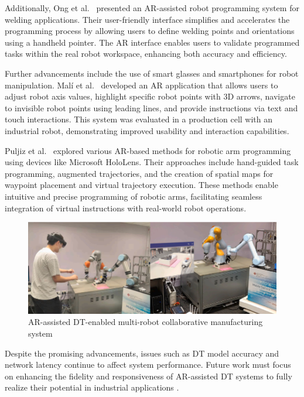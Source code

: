\begin{enumerate}
    Additionally, Ong et al.~\cite{ong2020} presented an AR-assisted robot programming system for welding applications. Their user-friendly interface 
    simplifies and accelerates the programming process by allowing users to define welding points and orientations using a handheld pointer. 
    The \ac{AR} interface enables users to validate programmed tasks within the real robot workspace, enhancing both accuracy and efficiency.
    
    Further advancements include the use of smart glasses and smartphones for robot manipulation. Malí et al.~\cite{7819154} developed an \ac{AR} 
    application that allows users to adjust robot axis values, highlight specific robot points with 3D arrows, navigate to invisible robot points using
    leading lines, and provide instructions via text and touch interactions. This system was evaluated in a production cell with an industrial robot, 
    demonstrating improved usability and interaction capabilities.

    Puljiz et al.~\cite{puljiz2019conceptsendtoendaugmentedreality,puljiz2} explored various AR-based methods for robotic arm programming using devices like Microsoft HoloLens. 
    Their approaches include hand-guided task programming, augmented trajectories, and the creation of spatial maps for waypoint placement and virtual 
    trajectory execution. These methods enable intuitive and precise programming of robotic arms, facilitating seamless integration of virtual instructions 
    with real-world robot operations.
    
    \begin{figure}[h]
        \centering
        \includegraphics[width=0.8\linewidth]{figs/physical-digital.png}
        \caption{\ac{AR}-assisted \ac{DT}-enabled multi-robot collaborative manufacturing system \cite{LI2022102321}}
        \label{fig:physical-digital}
    \end{figure}
    
    Despite the promising advancements, issues such as \ac{DT} model accuracy and network latency continue to affect system performance. Future work must 
    focus on enhancing the fidelity and responsiveness of \ac{AR}-assisted \ac{DT} systems to fully realize their potential in industrial applications 
    \cite{LI2022102321}.
\end{enumerate}
